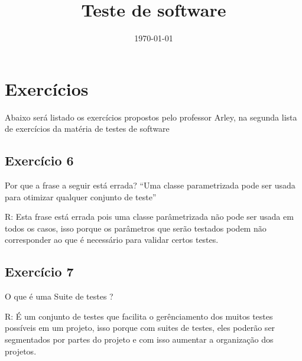 \documentclass[
	12pt,				%
	openany,			%
	a4paper,			%
	chapter=TITLE,		%
	section=TITLE,		%
	english,
	brazil				%
]{abntex2}
\title{Teste de software}
\date{\today}
\begin{document}
\maketitle

\chapter{Exercícios}

Abaixo será listado os exercícios propostos pelo professor Arley, na segunda lista de exercícios da matéria de testes de software

\section{Exercício 6}

 Por que a frase a seguir está errada? “Uma classe parametrizada pode ser usada para otimizar qualquer conjunto de teste”

R: Esta frase está errada pois uma classe parâmetrizada não pode ser usada em todos os casos, isso porque os parâmetros que  serão testados podem não corresponder ao que é necessário para validar certos testes.

\section{Exercício 7}

O que é uma Suite de testes ?

R: É um conjunto de testes que facilita o gerênciamento dos muitos testes possíveis em um projeto, isso porque com suites de testes, eles poderão ser segmentados por partes do projeto e com isso aumentar a organização dos projetos.
\end{document}
